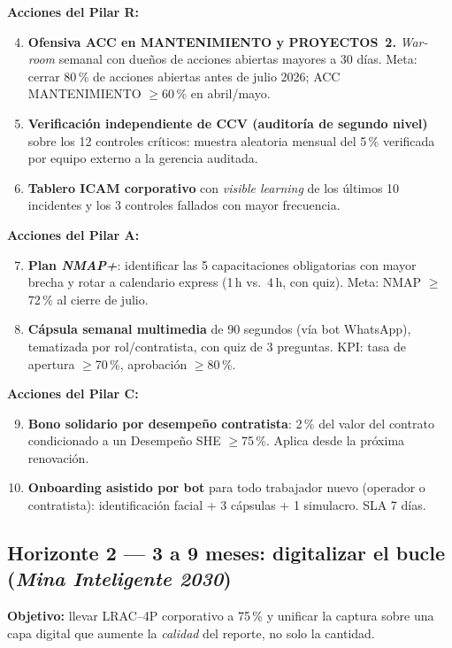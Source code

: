 \documentclass[12pt,a4paper]{article}
\begin{document}
\textbf{Acciones del Pilar R:}
\begin{enumerate}\setcounter{enumi}{3}
\item \textbf{Ofensiva ACC en MANTENIMIENTO y PROYECTOS~2.} \emph{War-room} semanal con dueños de acciones abiertas mayores a 30 días. Meta: cerrar 80\,\% de acciones abiertas antes de julio 2026; ACC MANTENIMIENTO $\geq$60\,\% en abril/mayo.
\item \textbf{Verificación independiente de CCV (auditoría de segundo nivel)} sobre los 12 controles críticos: muestra aleatoria mensual del 5\,\% verificada por equipo externo a la gerencia auditada.
\item \textbf{Tablero ICAM corporativo} con \emph{visible learning} de los últimos 10 incidentes y los 3 controles fallados con mayor frecuencia.
\end{enumerate}

\textbf{Acciones del Pilar A:}
\begin{enumerate}\setcounter{enumi}{6}
\item \textbf{Plan \emph{NMAP+}}: identificar las 5 capacitaciones obligatorias con mayor brecha y rotar a calendario express (1\,h vs.\ 4\,h, con quiz). Meta: NMAP $\geq$72\,\% al cierre de julio.
\item \textbf{Cápsula semanal multimedia} de 90 segundos (vía bot WhatsApp), tematizada por rol/contratista, con quiz de 3 preguntas. KPI: tasa de apertura $\geq$70\,\%, aprobación $\geq$80\,\%.
\end{enumerate}

\textbf{Acciones del Pilar C:}
\begin{enumerate}\setcounter{enumi}{8}
\item \textbf{Bono solidario por desempeño contratista}: 2\,\% del valor del contrato condicionado a un Desempeño SHE $\geq$75\,\%. Aplica desde la próxima renovación.
\item \textbf{Onboarding asistido por bot} para todo trabajador nuevo (operador o contratista): identificación facial + 3 cápsulas + 1 simulacro. SLA 7 días.
\end{enumerate}

\subsection{Horizonte 2 --- 3 a 9 meses: digitalizar el bucle (\emph{Mina Inteligente 2030})}

\begin{kbox}
\textbf{Objetivo:} llevar LRAC--4P corporativo a 75\,\% y unificar la captura sobre una capa digital que aumente la \emph{calidad} del reporte, no solo la cantidad.
\end{kbox}
\end{document}
